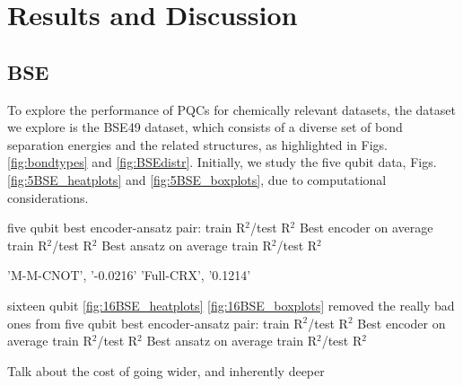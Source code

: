 \documentclass[journal=jacsat,manuscript=article]{achemso}
\begin{document}
\section{Results and Discussion}
\label{section:results_and_discussion}


\subsection{BSE}
To explore the performance of PQCs for chemically relevant datasets, the dataset we explore is the BSE49 dataset, which consists of a diverse set of bond separation energies and the related structures, as highlighted in Figs. \ref{fig:bondtypes} and \ref{fig:BSEdistr}.
Initially, we study the five qubit data, Figs. \ref{fig:5BSE_heatplots} and \ref{fig:5BSE_boxplots}, due to computational considerations.



five qubit 
best encoder-ansatz pair: train R$^{2}$/test R$^{2}$
Best encoder on average train R$^{2}$/test R$^{2}$
Best ansatz on average train R$^{2}$/test R$^{2}$

'M-M-CNOT', '-0.0216'
'Full-CRX', '0.1214'

sixteen qubit \ref{fig:16BSE_heatplots} \ref{fig:16BSE_boxplots}
removed the really bad ones from five qubit
best encoder-ansatz pair: train R$^{2}$/test R$^{2}$
Best encoder on average train R$^{2}$/test R$^{2}$
Best ansatz on average train R$^{2}$/test R$^{2}$


Talk about the cost of going wider, and inherently deeper
\end{document}
